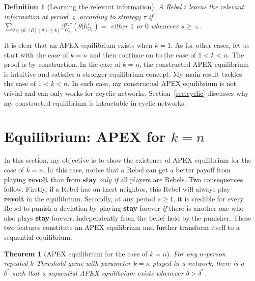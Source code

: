 \documentclass[12pt,letter]{article}
\newtheorem{theorem}{Theorem}
\newtheorem{definition}{Definition}[section]
\theoremstyle{definition}
\theoremstyle{remark}
\theoremstyle{claim}
\begin{document}
\begin{definition}[Learning the relevant information]\label{def_learn}
A Rebel $i$ learns the relevant information at period $\varsigma$ according to strategy $\tau$ if $\sum_{\theta\in\{\theta:[R](\theta)\geq k\}}\beta^{\pi,\tau}_{G_i}(\theta|h^{s}_{G_i})=$ either $1$ or $0$ whenever $s\geq \varsigma$.
\end{definition}

It is clear that an APEX equilibrium exists when $k=1$. As for other cases, let us start with the case of $k=n$ and then continue on to the case of $1<k<n$. The proof is by construction. In the case of $k=n$, the constructed APEX equilibrium is intuitive and satisfies a stronger equilibrium concept. My main result tackles the case of $1<k<n$. In such case, my constructed APEX equilibrium is not trivial and can only works for acyclic networks. Section~\ref{sec:cyclic} discusses why my constructed equilibrium is intractable in cyclic networks.

\section{Equilibrium: APEX for $k=n$}
\label{sec:equilibrium_1}

In this section, my objective is to show the existence of APEX equilibrium for the case of $k=n$. In this case, notice that a Rebel can get a better payoff from playing \textbf{revolt} than from \textbf{stay} \textit{only if} all players are Rebels. Two consequences follow. Firstly, if a Rebel has an Inert neighbor, this Rebel will always play \textbf{revolt} in the equilibrium. Secondly, at any period $s\geq 1$, it is credible for every Rebel to punish a deviation by playing \textbf{stay} forever \textit{if} there is another one who also plays \textbf{stay} forever, independently from the belief held by the punisher. These two features constitute an APEX equilibrium and further transform itself to a sequential equilibrium. 

\begin{theorem}[APEX equilibrium for the case of $k=n$]
\label{thm_minor_thm}
For any $n$-person repeated $k$-Threshold game with parameter $k=n$ played in a network, there is a $\delta^{*}$ such that a sequential APEX equilibrium exists whenever $\delta >
\delta^{*}$.
\end{theorem}
\end{document}
